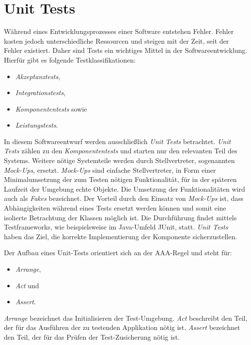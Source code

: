 \chapter{Unit Tests}
Während eines Entwicklungsprozesses einer Software entstehen Fehler.
Fehler kosten jedoch unterschiedliche Ressourcen und steigen mit der Zeit, seit der Fehler existiert.
Daher sind Tests ein wichtiges Mittel in der Softwareentwicklung.
Hierfür gibt es folgende Testklassifikationen:
\begin{itemize}
    \item \textit{Akzeptanztests},
    \item \textit{Integrationstests},
    \item \textit{Komponententests} sowie
    \item \textit{Leistungstests}.
\end{itemize}

In diesem Softwareentwurf werden ausschließlich \textit{Unit Tests} betrachtet.
\textit{Unit Tests} zählen zu den \textit{Komponententests} und starten nur den relevanten Teil des Systems.
Weitere nötige Systemteile werden durch Stellvertreter, sogenannten \textit{Mock-Ups}, ersetzt.
\textit{Mock-Ups} sind einfache Stellvertreter, in Form einer Minimalumsetzung der zum Testen nötigen Funktionalität, für in der späteren Laufzeit der Umgebung \glqq echte\grqq{} Objekte.
Die Umsetzung der Funktionalitäten wird auch als \textit{Fakes} bezeichnet.
Der Vorteil durch den Einsatz von \textit{Mock-Ups} ist, dass Abhängigkeiten während eines Tests ersetzt werden können und somit eine isolierte Betrachtung der Klassen möglich ist.
Die Durchführung findet mittels Testframeworks, wie beispielsweise im Java-Umfeld JUnit, statt.
\textit{Unit Tests} haben das Ziel, die korrekte Implementierung der Komponente sicherzustellen.

Der Aufbau eines Unit-Tests orientiert sich an der AAA-Regel und steht für:
\begin{itemize}
    \item \textit{Arrange},
    \item \textit{Act} und
    \item \textit{Assert}.
\end{itemize}

\textit{Arrange} bezeichnet das Initialisieren der Test-Umgebung.
\textit{Act} beschreibt den Teil, der für das Ausführen der zu testenden Applikation nötig ist.
\textit{Assert} bezeichnet den Teil, der für das Prüfen der Test-Zusicherung nötig ist.

